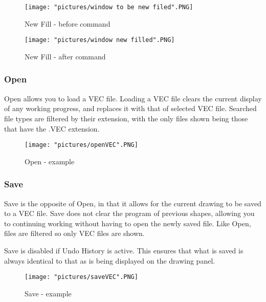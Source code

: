 \documentclass[12pt]{article} %
\begin{document}
\begin{figure}[hbtp]
\caption{New Fill - before command}
\centering
\texttt{[image: "pictures/window to be new filed".PNG]}
\end{figure}

\begin{figure}[hbtp]
\caption{New Fill - after command}
\centering
\texttt{[image: "pictures/window new filled".PNG]}
\end{figure}

\subsubsection{Open}
Open allows you to load a VEC file. Loading a VEC file clears the current display of any working progress, and replaces it with that of selected VEC file. Searched file types are filtered by their extension, with the only files shown being those that have the .VEC extension.

\begin{figure}[hbtp]
\caption{Open - example}
\centering
\texttt{[image: "pictures/openVEC".PNG]}
\end{figure}

\subsubsection{Save}
Save is the opposite of Open, in that it allows for the current drawing to be saved to a VEC file. Save does not clear the program of previous shapes, allowing you to continuing working without having to open the newly saved file. Like Open, files are filtered so only VEC files are shown. 

Save is disabled if Undo History is active. This ensures that what is saved is always identical to that as is being displayed on the drawing panel.

\begin{figure}[hbtp]
\caption{Save - example}
\centering
\texttt{[image: "pictures/saveVEC".PNG]}
\end{figure}
\end{document}
